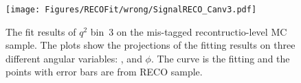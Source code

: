 




\begin{figure}[!hbt]
  \centering
  \texttt{[image: Figures/RECOFit/wrong/SignalRECO\_Canv3.pdf]}
  \caption{The fit results of $q^2$ bin~3 on the mis-tagged recontructio-level MC sample.
    The plots show the projections of the fitting results on three different angular variables: \cTL, \cTK and $\phi$.
    The curve is the fitting and the points with error bars are from RECO sample.}
  \label{fig:wtag-bin3}
\end{figure}

